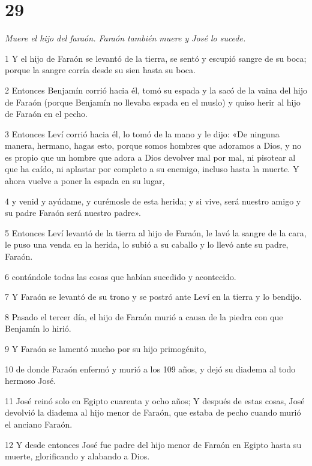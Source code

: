 \chapter{29}

\par \textit{Muere el hijo del faraón. Faraón también muere y José lo sucede.}

\par 1 Y el hijo de Faraón se levantó de la tierra, se sentó y escupió sangre de su boca; porque la sangre corría desde su sien hasta su boca.

\par 2 Entonces Benjamín corrió hacia él, tomó su espada y la sacó de la vaina del hijo de Faraón (porque Benjamín no llevaba espada en el muslo) y quiso herir al hijo de Faraón en el pecho.

\par 3 Entonces Leví corrió hacia él, lo tomó de la mano y le dijo: «De ninguna manera, hermano, hagas esto, porque somos hombres que adoramos a Dios, y no es propio que un hombre que adora a Dios devolver mal por mal, ni pisotear al que ha caído, ni aplastar por completo a su enemigo, incluso hasta la muerte. Y ahora vuelve a poner la espada en su lugar,

\par 4 y venid y ayúdame, y curémosle de esta herida; y si vive, será nuestro amigo y su padre Faraón será nuestro padre».

\par 5 Entonces Leví levantó de la tierra al hijo de Faraón, le lavó la sangre de la cara, le puso una venda en la herida, lo subió a su caballo y lo llevó ante su padre, Faraón.

\par 6 contándole todas las cosas que habían sucedido y acontecido.

\par 7 Y Faraón se levantó de su trono y se postró ante Leví en la tierra y lo bendijo.

\par 8 Pasado el tercer día, el hijo de Faraón murió a causa de la piedra con que Benjamín lo hirió.

\par 9 Y Faraón se lamentó mucho por su hijo primogénito,

\par 10 de donde Faraón enfermó y murió a los 109 años, y dejó su diadema al todo hermoso José.

\par 11 José reinó solo en Egipto cuarenta y ocho años; Y después de estas cosas, José devolvió la diadema al hijo menor de Faraón, que estaba de pecho cuando murió el anciano Faraón.

\par 12 Y desde entonces José fue padre del hijo menor de Faraón en Egipto hasta su muerte, glorificando y alabando a Dios.


